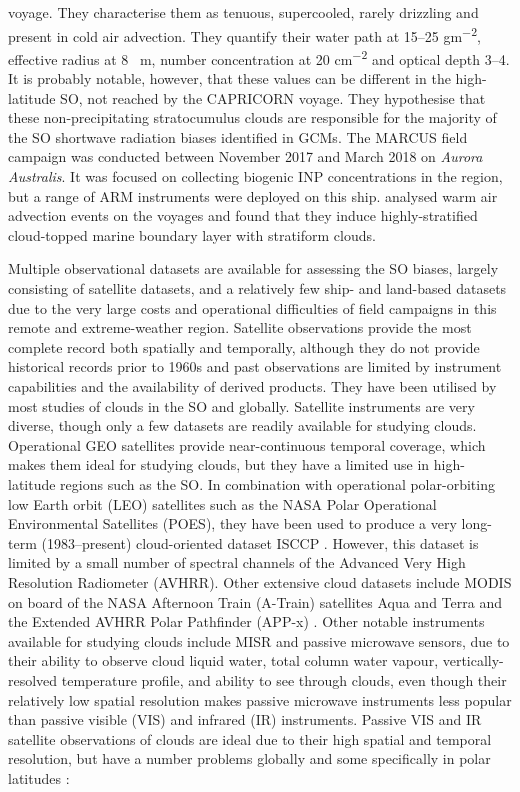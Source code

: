 voyage. They characterise them as tenuous, supercooled, rarely drizzling
and present in cold air advection. They quantify their water path at 15--25 \unit{gm^{-2}},
effective radius at 8 \unit{\mu m}, number concentration at 20 \unit{cm^{-2}} and optical
depth 3--4. It is probably notable, however, that these values can be different
in the high-latitude SO, not reached by the CAPRICORN voyage. They hypothesise
that these non-precipitating stratocumulus clouds are responsible for the majority
of the SO shortwave radiation biases identified in GCMs.
The MARCUS field campaign was conducted between November 2017 and March 2018
on \textit{Aurora Australis}. It was focused on collecting biogenic INP concentrations in the region,
but a range of ARM instruments were deployed on this ship.
\cite{zheng2019} analysed warm air advection events on the voyages and found
that they induce highly-stratified cloud-topped marine boundary layer with
stratiform clouds.

Multiple observational datasets are available for assessing the SO biases,
largely consisting of satellite datasets, and a relatively few ship- and
land-based datasets due to the very large costs and operational difficulties
of field campaigns in this remote and extreme-weather region. 
Satellite observations provide the most complete record both spatially and
temporally, although they do not provide historical records prior to
1960s and past observations are limited by instrument capabilities and
the availability of derived products. They have been utilised by most studies
of clouds in the SO and globally. Satellite instruments are very diverse, though only a few
datasets are readily available for studying clouds.
Operational GEO satellites provide near-continuous temporal
coverage,
which makes them ideal for studying clouds, but they have a limited use in
high-latitude regions such as the SO. In combination with operational polar-orbiting
low Earth orbit (LEO) satellites such as the NASA
Polar Operational Environmental Satellites (POES),
they have been used to produce a very long-term (1983--present) cloud-oriented
dataset ISCCP
\citep{schiffer1983}. However, this dataset is limited by
a small number of spectral channels of the Advanced Very High Resolution Radiometer
(AVHRR). Other extensive
cloud datasets include MODIS
on board of the NASA Afternoon Train (A-Train) satellites Aqua and Terra
and the Extended AVHRR Polar Pathfinder (APP-x) \citep{meier1997}. Other notable instruments available
for studying clouds include MISR
and passive
microwave sensors, due to their ability to observe cloud liquid water,
total column water vapour, vertically-resolved temperature profile, and
ability to see through clouds, even though their relatively low spatial
resolution makes passive microwave instruments less popular than passive visible (VIS) and infrared (IR)
instruments.
Passive VIS and IR satellite observations of clouds are ideal due to their high
spatial and temporal resolution, but have a number problems globally and some
specifically in polar latitudes \citep{bromwich2012}:

